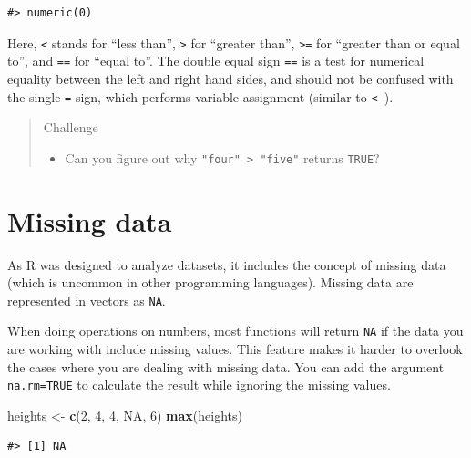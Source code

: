 \documentclass[]{book}
\newenvironment{Shaded}{\begin{snugshade}}{\end{snugshade}}
\newcommand{\KeywordTok}[1]{\textcolor[rgb]{0.13,0.29,0.53}{\textbf{#1}}}
\newcommand{\DecValTok}[1]{\textcolor[rgb]{0.00,0.00,0.81}{#1}}
\newcommand{\StringTok}[1]{\textcolor[rgb]{0.31,0.60,0.02}{#1}}
\newcommand{\OtherTok}[1]{\textcolor[rgb]{0.56,0.35,0.01}{#1}}
\newcommand{\NormalTok}[1]{#1}
\providecommand{\tightlist}{%
  \setlength{\itemsep}{0pt}\setlength{\parskip}{0pt}}
\theoremstyle{definition}
\theoremstyle{definition}
\theoremstyle{definition}
\theoremstyle{remark}
\begin{document}
\begin{verbatim}
#> numeric(0)
\end{verbatim}

Here, \texttt{\textless{}} stands for ``less than'',
\texttt{\textgreater{}} for ``greater than'', \texttt{\textgreater{}=}
for ``greater than or equal to'', and \texttt{==} for ``equal to''. The
double equal sign \texttt{==} is a test for numerical equality between
the left and right hand sides, and should not be confused with the
single \texttt{=} sign, which performs variable assignment (similar to
\texttt{\textless{}-}).

\begin{quote}
Challenge

\begin{itemize}
\tightlist
\item
  Can you figure out why \texttt{"four"\ \textgreater{}\ "five"} returns
  \texttt{TRUE}?
\end{itemize}
\end{quote}

\section{Missing data}\label{missing-data}

As R was designed to analyze datasets, it includes the concept of
missing data (which is uncommon in other programming languages). Missing
data are represented in vectors as \texttt{NA}.

When doing operations on numbers, most functions will return \texttt{NA}
if the data you are working with include missing values. This feature
makes it harder to overlook the cases where you are dealing with missing
data. You can add the argument \texttt{na.rm=TRUE} to calculate the
result while ignoring the missing values.

\begin{Shaded}
\begin{Highlighting}[]
\NormalTok{heights <-}\StringTok{ }\KeywordTok{c}\NormalTok{(}\DecValTok{2}\NormalTok{, }\DecValTok{4}\NormalTok{, }\DecValTok{4}\NormalTok{, }\OtherTok{NA}\NormalTok{, }\DecValTok{6}\NormalTok{)}
\KeywordTok{max}\NormalTok{(heights)}
\end{Highlighting}
\end{Shaded}

\begin{verbatim}
#> [1] NA
\end{verbatim}
\end{document}
